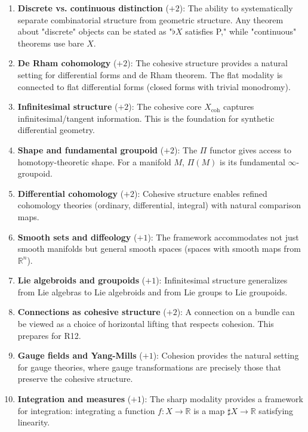 \documentclass[11pt]{article}
\theoremstyle{definition}
\begin{document}
\begin{enumerate}
\item \textbf{Discrete vs. continuous distinction} ($+2$): The ability to systematically separate combinatorial structure from geometric structure. Any theorem about "discrete" objects can be stated as "$\flat X$ satisfies P," while "continuous" theorems use bare $X$.

\item \textbf{De Rham cohomology} ($+2$): The cohesive structure provides a natural setting for differential forms and de Rham theorem. The flat modality is connected to flat differential forms (closed forms with trivial monodromy).

\item \textbf{Infinitesimal structure} ($+2$): The cohesive core $X_{\text{coh}}$ captures infinitesimal/tangent information. This is the foundation for synthetic differential geometry.

\item \textbf{Shape and fundamental groupoid} ($+2$): The $\Pi$ functor gives access to homotopy-theoretic shape. For a manifold $M$, $\Pi(M)$ is its fundamental $\infty$-groupoid.

\item \textbf{Differential cohomology} ($+2$): Cohesive structure enables refined cohomology theories (ordinary, differential, integral) with natural comparison maps.

\item \textbf{Smooth sets and diffeology} ($+1$): The framework accommodates not just smooth manifolds but general smooth spaces (spaces with smooth maps from $\mathbb{R}^n$).

\item \textbf{Lie algebroids and groupoids} ($+1$): Infinitesimal structure generalizes from Lie algebras to Lie algebroids and from Lie groups to Lie groupoids.

\item \textbf{Connections as cohesive structure} ($+2$): A connection on a bundle can be viewed as a choice of horizontal lifting that respects cohesion. This prepares for R12.

\item \textbf{Gauge fields and Yang-Mills} ($+1$): Cohesion provides the natural setting for gauge theories, where gauge transformations are precisely those that preserve the cohesive structure.

\item \textbf{Integration and measures} ($+1$): The sharp modality provides a framework for integration: integrating a function $f : X \to \mathbb{R}$ is a map $\sharp X \to \mathbb{R}$ satisfying linearity.


\end{enumerate}
\end{document}
